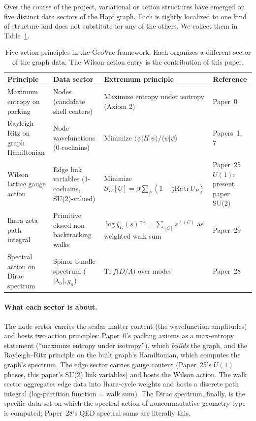\documentclass[11pt]{article}
\begin{document}
Over the course of the project, variational or action structures have
emerged on five distinct data sectors of the Hopf graph.  Each is
tightly localized to one kind of structure and does not substitute
for any of the others.  We collect them in
Table~\ref{tab:action_principles}.

\begin{table}[t]
\centering
\small
\caption{Five action principles in the GeoVac framework.  Each
organizes a different sector of the graph data.  The Wilson-action
entry is the contribution of this paper.}
\label{tab:action_principles}
\begin{tabular}{>{\raggedright\arraybackslash}p{3.2cm}>{\raggedright\arraybackslash}p{3.1cm}>{\raggedright\arraybackslash}p{3.0cm}>{\raggedright\arraybackslash}p{3.2cm}}
\toprule
Principle & Data sector & Extremum principle & Reference \\
\midrule
Maximum entropy on packing & Nodes (candidate shell centers) & Maximize entropy under isotropy (Axiom 2) & Paper~0~\cite{paper0} \\
\addlinespace
Rayleigh--Ritz on graph Hamiltonian & Node wavefunctions (0-cochains) & Minimize $\langle \psi | H | \psi \rangle / \langle \psi | \psi \rangle$ & Papers~1, 7~\cite{paper7} \\
\addlinespace
Wilson lattice gauge action & Edge link variables (1-cochains, SU(2)-valued) & Minimize $S_W[U] = \beta \sum_P (1 - \tfrac{1}{2}\mathrm{Re}\,\mathrm{tr}\,U_P)$ & Paper~25~\cite{paper25} $U(1)$; present paper SU(2) \\
\addlinespace
Ihara zeta path integral & Primitive closed non-backtracking walks & $\log \zeta_G(s)^{-1} = \sum_{[C]} s^{\ell(C)}$ as weighted walk sum & Paper~29~\cite{paper29} \\
\addlinespace
Spectral action on Dirac spectrum & Spinor-bundle spectrum ($|\lambda_n|, g_n$) & $\mathrm{Tr}\,f\bigl(D / \Lambda\bigr)$ over modes & Paper~28~\cite{paper28} \\
\bottomrule
\end{tabular}
\end{table}

\paragraph*{What each sector is about.}
The node sector carries the scalar matter content (the wavefunction
amplitudes) and hosts two action principles: Paper~0's packing
axioms as a max-entropy statement (``maximize entropy under
isotropy''), which \emph{builds} the graph, and the Rayleigh--Ritz
principle on the built graph's Hamiltonian, which computes the
graph's spectrum.  The edge sector carries gauge content (Paper~25's
$U(1)$ phases, this paper's SU(2) link variables) and hosts the
Wilson action.  The walk sector aggregates edge data into
Ihara-cycle weights and hosts a discrete path integral
(log-partition function = walk sum).  The Dirac spectrum, finally,
is the specific data set on which the spectral action of
noncommutative-geometry type is computed; Paper~28's QED spectral
sums are literally this.
\end{document}
